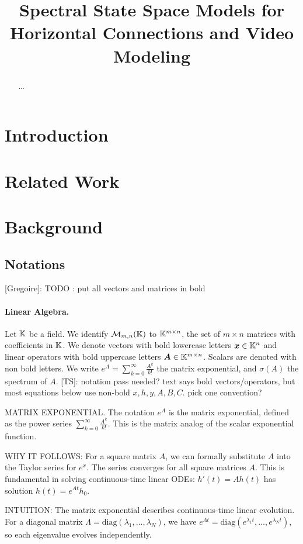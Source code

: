 \documentclass{article}
\title{Spectral State Space Models for Horizontal Connections and Video Modeling}
\author{}
\newcommand{\greg}[1]{{\color{indigo}[Gregoire]: #1}}
\newcommand{\TS}[1]{{\color{pink}[TS]: #1}}
\begin{document}
\doparttoc %
\faketableofcontents %

\maketitle

\begin{abstract}
...
\end{abstract}

\section{Introduction}

\section{Related Work}

\section{Background}

\subsection{Notations}

\greg{TODO : put all vectors and matrices in bold}

\paragraph{Linear Algebra.} Let $\mathbb{K}$ be a field. We identify $\mathcal{M}_{m,n}(\mathbb{K})$ to $\mathbb{K}^{m \times n}$, the set of $m \!\times\! n$ matrices with coefficients in $\mathbb{K}$. We denote vectors with bold lowercase letters $\bm x \in \mathbb{K}^n$ and linear operators with bold uppercase letters $\bm A \in \mathbb{K}^{m \times n}$. Scalars are denoted with non bold letters. We write $e^A = \sum_{k=0}^\infty \frac{A^k}{k!}$ the matrix exponential, and $\sigma(A)$ the spectrum of $A$.
\TS{notation pass needed? text says bold vectors/operators, but most equations below use non-bold $x,h,y,A,B,C$. pick one convention?}

\begin{thomasbox}
MATRIX EXPONENTIAL. The notation $e^A$ is the matrix exponential, defined as the power series $\sum_{k=0}^\infty \frac{A^k}{k!}$. This is the matrix analog of the scalar exponential function.

WHY IT FOLLOWS: For a square matrix $A$, we can formally substitute $A$ into the Taylor series for $e^x$. The series converges for all square matrices $A$. This is fundamental in solving continuous-time linear ODEs: $h'(t) = Ah(t)$ has solution $h(t) = e^{At}h_0$.

INTUITION: The matrix exponential describes continuous-time linear evolution. For a diagonal matrix $\Lambda = \mathrm{diag}(\lambda_1, \ldots, \lambda_N)$, we have $e^{\Lambda t} = \mathrm{diag}(e^{\lambda_1 t}, \ldots, e^{\lambda_N t})$, so each eigenvalue evolves independently.
\end{thomasbox}
\end{document}
